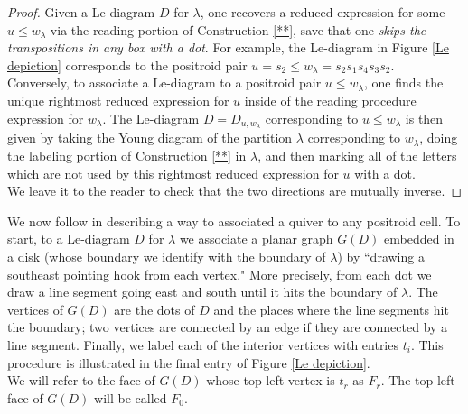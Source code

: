 \documentclass[11pt]{amsart}
\theoremstyle{definition}
\theoremstyle{remark}
\numberwithin{equation}{section}
\begin{document}
\begin{proof}
    Given a Le-diagram $D$ for $\lambda$, one recovers a reduced expression for some $u \leq w_\lambda$ via the reading portion of Construction \ref{**}, save that one \textit{skips the transpositions in any box with a dot}. For example, the Le-diagram in Figure \ref{Le depiction} corresponds to the positroid pair $u = s_2 \leq w_\lambda = s_2s_1s_4s_3s_2$.\\

    Conversely, to associate a Le-diagram to a positroid pair $u \leq w_\lambda$, one finds the unique rightmost reduced expression for $u$ inside of the reading procedure expression for $w_\lambda$. The Le-diagram $D = D_{u,w_\lambda}$ corresponding to $u \leq w_\lambda$ is then given by taking the Young diagram of the partition $\lambda$ corresponding to $w_\lambda$, doing the labeling portion of Construction \ref{**} in $\lambda$, and then marking all of the letters which are not used by this rightmost reduced expression for $u$ with a dot.\\

    We leave it to the reader to check that the two directions are mutually inverse.
\end{proof} 

We now follow \cite{GaLa} in describing a way to associated a quiver to any positroid cell. To start, to a Le-diagram $D$ for $\lambda$ we associate a planar graph $G(D)$ embedded in a disk (whose boundary we identify with the boundary of $\lambda$) by ``drawing a southeast pointing hook from each vertex." More precisely, from each dot we draw a line segment going east and south until it hits the boundary of $\lambda$. The vertices of $G(D)$ are the dots of $D$ and the places where the line segments hit the boundary; two vertices are connected by an edge if they are connected by a line segment. Finally, we label each of the interior vertices with entries $t_i$. This procedure is illustrated in the final entry of Figure \ref{Le depiction}.\\

We will refer to the face of $G(D)$ whose top-left vertex is $t_r$ as $F_r$. The top-left face of $G(D)$ will be called $F_0$.
\end{document}
